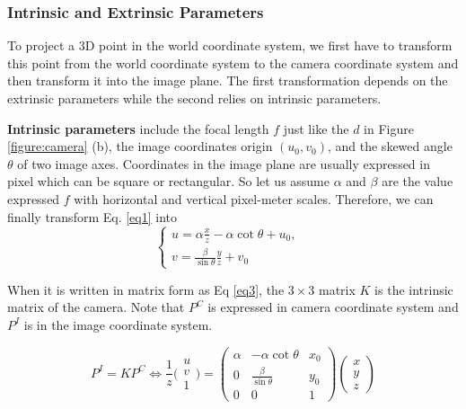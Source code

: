\documentclass[a4paper,12pt]{article}
\begin{document}
\subsubsection{Intrinsic and Extrinsic Parameters}
\label{projection}

To project a 3D point in the world coordinate system, we first have to transform this point from the world coordinate system to the camera coordinate system and then transform it into the image plane. The first transformation depends on the extrinsic parameters while the second relies on intrinsic parameters.

\textbf{Intrinsic parameters} include the focal length $f$ just like the $d$ in Figure \ref{figure:camera} (b), the image coordinates origin $(u_0, v_0)$, and the skewed angle $\theta$ of two image axes. Coordinates in the image plane are usually expressed in pixel which can be square or rectangular. So let us assume $\alpha$ and $\beta$ are the value expressed $f$ with horizontal and vertical pixel-meter scales. Therefore, we can finally transform Eq. \ref{eq1} into 
\begin{equation}
\label{eq2}
	\begin{cases}
	u = \alpha \frac{x}{z} - \alpha \cot\theta + u_0, & \\    
	v = \frac{\beta}{\sin\theta} \frac{y}{z} + v_0
	\end{cases}
\end{equation}

When it is written in matrix form as Eq \ref{eq3}, the $3\times3$ matrix $K$ is the intrinsic matrix of the camera. Note that $P^C$ is expressed in camera coordinate system and $P^I$ is in the image coordinate system.

\begin{equation}
\label{eq3}
P^I = K P^C \Leftrightarrow \frac{1}{z}
\bigl(\begin{smallmatrix}
u\\  v \\1
\end{smallmatrix}\bigr) 
= 
\begin{pmatrix}
\alpha & -\alpha \cot\theta & x_0\\ 0 & \frac{\beta}{\sin\theta}  & y_0\\  0 &0  &1 
\end{pmatrix}
\begin{pmatrix} 
x\\  y\\  z
\end{pmatrix}
\end{equation}
\end{document}
